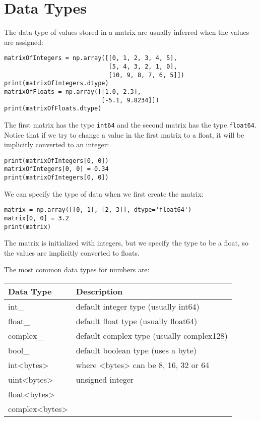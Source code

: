 \documentclass[12pt, a4paper]{article}
\begin{document}
\section{Data Types}
\label{sec:orga275776}
The data type of values stored in a matrix are usually inferred when the values are assigned:
\lstset{language=jupyter-python,label= ,caption= ,captionpos=b,numbers=none}
\begin{lstlisting}
matrixOfIntegers = np.array([[0, 1, 2, 3, 4, 5],
                             [5, 4, 3, 2, 1, 0],
                             [10, 9, 8, 7, 6, 5]])
print(matrixOfIntegers.dtype)
matrixOfFloats = np.array([[1.0, 2.3],
                           [-5.1, 9.8234]])
print(matrixOfFloats.dtype)
\end{lstlisting}
The first matrix has the type \texttt{int64} and the second matrix has the type \texttt{float64}.
Notice that if we try to change a value in the first matrix to a float, it will be implicitly converted to an integer:
\lstset{language=jupyter-python,label= ,caption= ,captionpos=b,numbers=none}
\begin{lstlisting}
print(matrixOfIntegers[0, 0])
matrixOfIntegers[0, 0] = 0.34
print(matrixOfIntegers[0, 0])
\end{lstlisting}
We can specify the type of data when we first create the matrix:
\lstset{language=jupyter-python,label= ,caption= ,captionpos=b,numbers=none}
\begin{lstlisting}
matrix = np.array([[0, 1], [2, 3]], dtype='float64')
matrix[0, 0] = 3.2
print(matrix)
\end{lstlisting}
The matrix is initialized with integers, but we specify the type to be a float, so the values are implicitly converted to floats.

The most common data types for numbers are:
\begin{center}
\begin{tabular}{ll}
Data Type & Description\\
\hline
int\_ & default integer type (usually int64)\\
float\_ & default float type (usually float64)\\
complex\_ & default complex type (usually complex128)\\
bool\_ & default boolean type (uses a byte)\\
\hline
int<bytes> & where <bytes> can be 8, 16, 32 or 64\\
uint<bytes> & unsigned integer\\
float<bytes> & \\
complex<bytes> & \\
\end{tabular}
\end{center}
\end{document}
